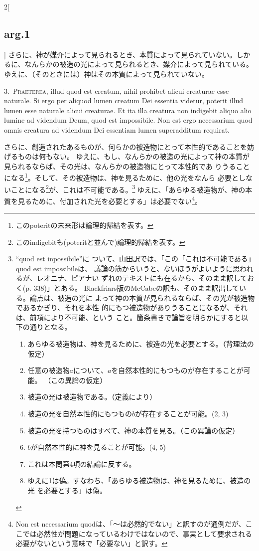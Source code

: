 \documentclass[paper=a4paper,fontsize=10pt,jafontsize=9pt,titlepage]{jlreq}
\begin{document}
\begin{paracol}{2}[\subsection{arg.1}]
さらに、神が媒介によって見られるとき、本質によって見られていない。しか
るに、なんらかの被造の光によって見られるとき、媒介によって見られている。
ゆえに、（そのときには）神はその本質によって見られていない。


3.~{\scshape Praeterea}, illud quod est creatum, nihil prohibet alicui
creaturae esse naturale. Si ergo per aliquod lumen creatum Dei
essentia videtur, poterit illud lumen esse naturale alicui
creaturae. Et ita illa creatura non indigebit aliquo alio lumine ad
videndum Deum, quod est impossibile. Non est ergo necessarium quod
omnis creatura ad videndum Dei essentiam lumen superadditum requirat.

\switchcolumn

さらに、創造されたあるものが、何らかの被造物にとって本性的であることを妨げるものは何もない。
ゆえに、もし、なんらかの被造の光によって神の本質が見られるならば、その光は、なんらかの被造物にとって本性的であ
りうることになる\footnote{このpoteritの未来形は論理的帰結を表す。}。そして、その被造物は、神を見るために、他の光をなんら
必要としないことになる\footnote{このindigebitも(poteritと並んで)論理的帰結を表す。}が、これは不可能である。\footnote{``quod est inpossibile''に
ついて、山田訳では、「この「これは不可能である」quod est impossibileは、
議論の筋からいうと、ないほうがよいように思われるが、レオニナ、ピアナい
ずれのテキストにも在るから、そのまま訳しておく(p. 338)」とある。
Blackfriars版のMcCabeの訳も、そのまま訳出している。論点は、被造の光に
よって神の本質が見られるならば、その光が被造物であるかぎり、それを本性
的にもつ被造物がありうることになるが、それは、前項により不可能、という
こと。箇条書きで論旨を明らかにすると以下の通りとなる。
\begin{enumerate}
 \item あらゆる被造物は、神を見るために、被造の光を必要とする。（背理法の仮定）
 \item 任意の被造物$a$について、$a$を自然本性的にもつものが存在することが可能。
       （この異論の仮定）
 \item 被造の光は被造物である。（定義により）
 \item 被造の光を自然本性的にもつもの$b$が存在することが可能。(2, 3)
 \item 被造の光を持つものはすべて、神の本質を見る。（この異論の仮定）
 \item $b$が自然本性的に神を見ることが可能。(4, 5)
 \item これは本問第4項の結論に反する。
 \item ゆえに1は偽。すなわち、「あらゆる被造物は、神を見るために、被造の光
       を必要とする」は偽。
\end{enumerate}
}
ゆえに、「あらゆる被造物が、神の本質を見るために、付加された光を必要とする」は必要でない\footnote{Non est necessarium quodは、「〜は必然的でない」と訳すのが通例だが、ここでは必然性が問題になっているわけではないので、事実として要求される必要がないという意味で「必要ない」と訳す。}。


\end{paracol}
\end{document}
